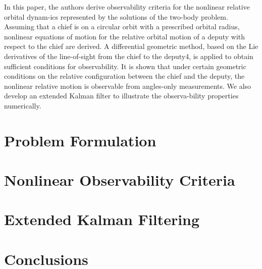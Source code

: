 \documentclass[12pt,letterpaper]{ISSFD_v01}
\begin{document}
In this paper, the authors derive observability criteria for the nonlinear relative orbital dynam-ics represented by the solutions of the two-body problem.  Assuming that a chief is on a circular orbit with a prescribed orbital radius, nonlinear equations of motion for the relative orbital motion of a deputy with respect to the chief are derived.  A differential geometric method, based on the Lie derivatives of the line-of-sight from the chief to the deputy4, is applied to obtain sufficient conditions for observability.  It is shown that under certain geometric conditions on the relative configuration between the chief and the deputy, the nonlinear relative motion is observable from angles-only measurements.  We also develop an extended Kalman filter to illustrate the observa-bility properties numerically.


\section{Problem Formulation}

\section{Nonlinear Observability Criteria}


\section{Extended Kalman Filtering}

\section{Conclusions}



\end{document}
